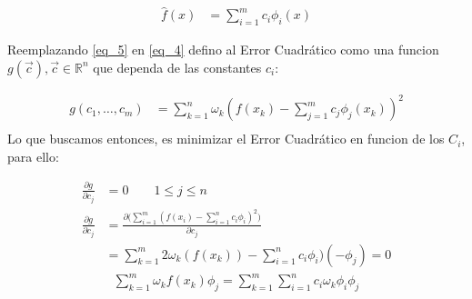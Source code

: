 \documentclass[10pt,a4paper]{article}
\numberwithin{equation}{section}
\numberwithin{figure}{section}
\numberwithin{table}{section}
\begin{document}
\begin{equation}\label{eq_5}
    \begin{split}
        \hat{f}(x) &= \sum_{i=1}^{m} c_i \phi_i(x)  
    \end{split}
\end{equation}

Reemplazando \ref*{eq_5} en \ref*{eq_4} defino al Error Cuadrático como una funcion $g(\vec{c}), \vec{c} \in \mathbb{R}^n $ que dependa de las constantes $c_i$:

\begin{equation}\label{eq_6}
    \begin{split}
        g(c_1,\ldots,c_m) &= \sum_{k=1}^n \omega_k ( f(x_k) - \sum_{j=1}^m  c_j \phi_j(x_k))^2\\
    \end{split}
\end{equation}
Lo que buscamos entonces, es minimizar el Error Cuadrático en funcion de los $C_i$, para ello:

\begin{equation}\label{eq_7}
    \begin{split}
        \frac{\partial g }{\partial c_j} &= 0 \qquad 1 \leq j \leq n \\
        \frac{\partial g }{\partial c_j} &= \frac{\partial \big( \sum\limits_{i=1}^m ( f(x_i) - \sum\limits_{i=1}^n  c_i \phi_i)^2 \big) }{\partial c_j}  \\
        &= \sum_{k=1}^m 2\omega_k (f(x_k)) - \sum_{i=1}^n c_i \phi_i) (-\phi_j) = 0
    \end{split}
\end{equation}        
\begin{equation}\label{eq_8}
     \begin{split}
        \sum_{k=1}^m \omega_k f(x_k) \phi_j = \sum_{k=1}^m \sum_{i=1}^n c_i \omega_k \phi_i \phi_j
     \end{split}
\end{equation}
\end{document}
